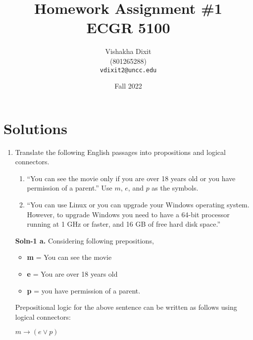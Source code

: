 \documentclass{article}
\begin{document}
\title{Homework Assignment \#1 \\ ECGR 5100}
\author{
  Vishakha Dixit \\
  (801265288) \\
  \texttt{vdixit2@uncc.edu}
}
\date{Fall 2022}
\maketitle

\section*{Solutions}
\begin{enumerate}
\item   Translate the following English passages into propositions
        and logical connectors.
        \begin{enumerate}
        \item   {\sffamily ``You can see the movie only if you are
                over 18 years old or you have permission of a parent.''}
                Use $m$, $e$, and $p$ as the symbols.
        \item   {\sffamily ``You can use Linux or you can upgrade your
                Windows operating system.  However, to upgrade Windows
                you need to have a 64-bit processor running at 1 GHz
                or faster, and 16 GB of free hard disk space.''}
        \end{enumerate}

        \textbf{Soln-1 a.} Considering following prepositions, 
        \begin{itemize}
                \item   \textbf{m} = You can see the movie 
                \item   \textbf{e} = You are over 18 years old
                \item   \textbf{p} = you have permission of a parent. 
        \end{itemize}
        Prepositional logic for the above sentence can be written as follows using logical connectors: 
        \begin{center}
       $m \rightarrow (e \vee p)$
        \end{center}


\end{enumerate}
\end{document}
